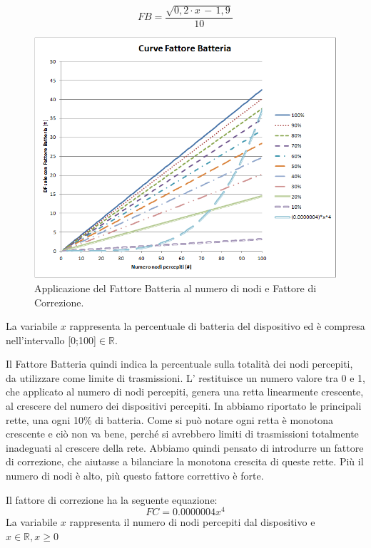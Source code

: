 \begin{equation}
	\label{eq:df_FB}
	FB = \dfrac{\sqrt{0,2\cdot x\,-\,1,9}}{10}
\end{equation}
\begin{figure}[tb]
	\centering
	\includegraphics[width=0.9\linewidth]{Images/grafici_usati/DF_curve_fattore_batteria_corr}
	\caption[DF curve fb con correzione]{Applicazione del Fattore Batteria al numero di nodi e Fattore di Correzione.}
	\label{fig:DF_curve_fattore_batteria_corr}
\end{figure}
La variabile $\textit{x}$ rappresenta la percentuale di batteria del dispositivo ed è compresa nell'intervallo [0;100]$\in\mathbb{R}$.

Il Fattore Batteria quindi indica la percentuale sulla totalità dei nodi percepiti, da utilizzare come limite di trasmissioni. L' restituisce un numero valore tra 0 e 1, che applicato al numero di nodi percepiti, genera una retta linearmente crescente, al crescere del numero dei dispositivi percepiti. In  abbiamo riportato le principali rette, una ogni 10\% di batteria. Come si può notare ogni retta è monotona crescente e ciò non va bene, perché si avrebbero limiti di trasmissioni totalmente inadeguati al crescere della rete. Abbiamo quindi pensato di introdurre un fattore di correzione, che aiutasse a bilanciare la monotona crescita di queste rette. Più il numero di nodi è alto, più questo fattore correttivo è forte.

Il fattore di correzione ha la seguente equazione:
\begin{equation}
	\label{eq:df_FC}
	FC = 0.0000004x^4
\end{equation}
La variabile $\textit{x}$ rappresenta il numero di nodi percepiti dal dispositivo e $ \textit{x}\in\mathbb{R},x\geq0$

